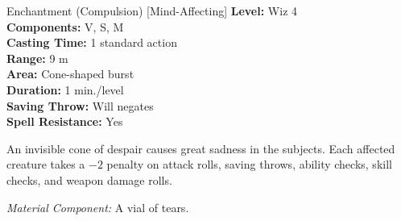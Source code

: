 {Enchantment (Compulsion) [Mind-Affecting]}
{
	\textbf{Level:}
	Wiz 4\\
	\textbf{Components:}
	V, S, M\\
	\textbf{Casting Time:}
	1 standard action\\
	\textbf{Range:}
	9 m\\
	\textbf{Area:}
	Cone-shaped burst\\
	\textbf{Duration:}
	1 min./level\\
	\textbf{Saving Throw:}
	Will negates\\
	\textbf{Spell Resistance:}
	Yes\\
}
{
	An invisible cone of despair causes great sadness in the subjects. Each affected creature takes a $-2$ penalty on attack rolls, saving throws, ability checks, skill checks, and weapon damage rolls.


	\textit{Material Component:}
	A vial of tears.

}
